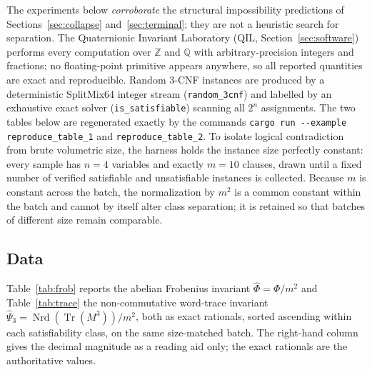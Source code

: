 \documentclass[pdflatex,sn-mathphys-num]{sn-jnl}
\theoremstyle{thmstyleone}%
\theoremstyle{thmstyletwo}%
\theoremstyle{thmstylethree}%
\newcommand{\QQ}{\mathbb{Q}}
\newcommand{\ZZ}{\mathbb{Z}}
\newcommand{\Nrd}{\operatorname{Nrd}}
\newcommand{\Tr}{\operatorname{Tr}}
\begin{document}
The experiments below \emph{corroborate} the structural impossibility
predictions of Sections~\ref{sec:collapse} and~\ref{sec:terminal}; they are
not a heuristic search for separation. The Quaternionic Invariant Laboratory
(QIL, Section~\ref{sec:software})
performs every computation over $\ZZ$ and $\QQ$ with arbitrary-precision
integers and fractions; no floating-point primitive appears anywhere, so all
reported quantities are exact and reproducible. Random $3$-CNF instances are
produced by a deterministic SplitMix64 integer stream (\texttt{random\_3cnf})
and labelled by an exhaustive exact solver (\texttt{is\_satisfiable}) scanning
all $2^n$ assignments. The two tables below are regenerated exactly by the
commands \texttt{cargo run -{}-example reproduce\_table\_1} and
\texttt{reproduce\_table\_2}. To isolate logical contradiction from brute
volumetric size, the harness holds the instance size perfectly constant:
every sample has $n=4$ variables and exactly $m=10$ clauses, drawn until a
fixed number of verified satisfiable and unsatisfiable instances is
collected. Because $m$ is constant across the batch, the normalization by
$m^2$ is a common constant within the batch and cannot by itself alter class
separation; it is retained so that batches of different size remain
comparable.

\subsection{Data}

Table~\ref{tab:frob} reports the abelian Frobenius invariant
$\widehat\Phi=\Phi/m^2$ and Table~\ref{tab:trace} the non-commutative
word-trace invariant $\widehat\Psi_3=\Nrd(\Tr(M^3))/m^2$, both as exact
rationals, sorted ascending within each satisfiability class, on the same
size-matched batch. The right-hand column gives the decimal magnitude as a
reading aid only; the exact rationals are the authoritative values.
\end{document}
